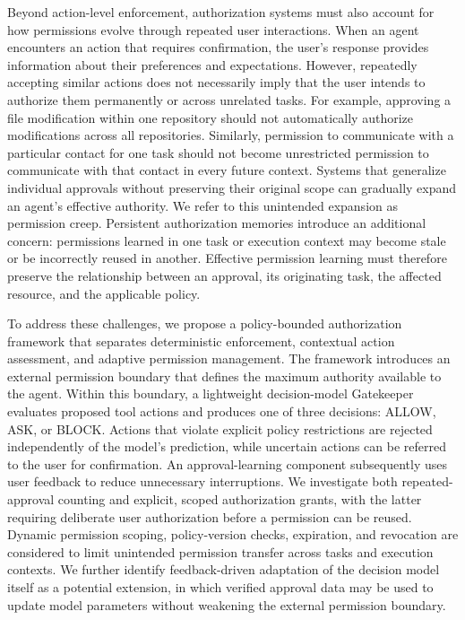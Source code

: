 \documentclass[10pt,conference]{IEEEtran}
\begin{document}
Beyond action-level enforcement, authorization systems must also account for how permissions evolve through repeated user interactions. When an agent encounters an action that requires confirmation, the user's response provides information about their preferences and expectations. However, repeatedly accepting similar actions does not necessarily imply that the user intends to authorize them permanently or across unrelated tasks. For example, approving a file modification within one repository should not automatically authorize modifications across all repositories. Similarly, permission to communicate with a particular contact for one task should not become unrestricted permission to communicate with that contact in every future context. Systems that generalize individual approvals without preserving their original scope can gradually expand an agent's effective authority. We refer to this unintended expansion as permission creep. Persistent authorization memories introduce an additional concern: permissions learned in one task or execution context may become stale or be incorrectly reused in another. Effective permission learning must therefore preserve the relationship between an approval, its originating task, the affected resource, and the applicable policy.

To address these challenges, we propose a policy-bounded authorization framework that separates deterministic enforcement, contextual action assessment, and adaptive permission management. The framework introduces an external permission boundary that defines the maximum authority available to the agent. Within this boundary, a lightweight decision-model Gatekeeper evaluates proposed tool actions and produces one of three decisions: ALLOW, ASK, or BLOCK. Actions that violate explicit policy restrictions are rejected independently of the model's prediction, while uncertain actions can be referred to the user for confirmation. An approval-learning component subsequently uses user feedback to reduce unnecessary interruptions. We investigate both repeated-approval counting and explicit, scoped authorization grants, with the latter requiring deliberate user authorization before a permission can be reused. Dynamic permission scoping, policy-version checks, expiration, and revocation are considered to limit unintended permission transfer across tasks and execution contexts. We further identify feedback-driven adaptation of the decision model itself as a potential extension, in which verified approval data may be used to update model parameters without weakening the external permission boundary.
\end{document}
